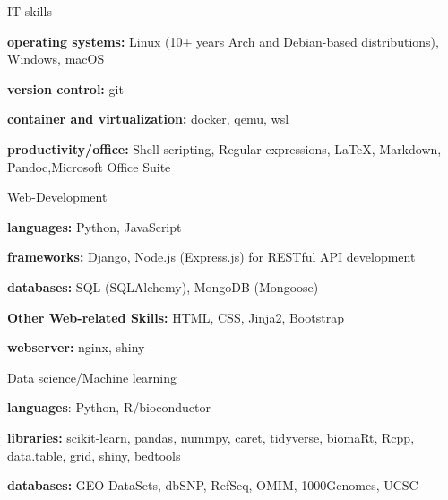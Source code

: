 

\begin{cvskills}
  \cvskill
    {IT skills} %
    {
      \begin{cvitems}
        \item {\textbf{operating systems:} Linux (10+ years Arch and Debian-based distributions), Windows, macOS}
        \item {\textbf{version control:} git}
        \item {\textbf{container and virtualization:} docker, qemu, wsl}
        \item {\textbf{productivity/office:} Shell scripting, Regular expressions, LaTeX, Markdown, Pandoc,\newline Microsoft Office Suite}
      \end{cvitems}
      }
\cvskill
      {Web-Development} %
      {
        \begin{cvitems}
          \item {\textbf{languages:} Python, JavaScript}
          \item {\textbf{frameworks:} Django, Node.js (Express.js) for RESTful API development}
          \item {\textbf{databases:} SQL (SQLAlchemy), MongoDB (Mongoose)}
          \item {\textbf{Other Web-related Skills:} HTML, CSS, Jinja2, Bootstrap}
          \item {\textbf{webserver:} nginx, shiny}
        \end{cvitems}
        }
  \cvskill
    {Data science/Machine learning}%
    {
      \begin{cvitems}
        \item {\textbf{languages}: Python, R/bioconductor}
        \item {\textbf{libraries:} scikit-learn, pandas, nummpy, caret, tidyverse, biomaRt, Rcpp, data.table, grid,        \newline shiny, bedtools}
        \item {\textbf{databases:} GEO DataSets, dbSNP, RefSeq, OMIM, 1000Genomes, UCSC}

\end{cvitems}}
\end{cvskills}
